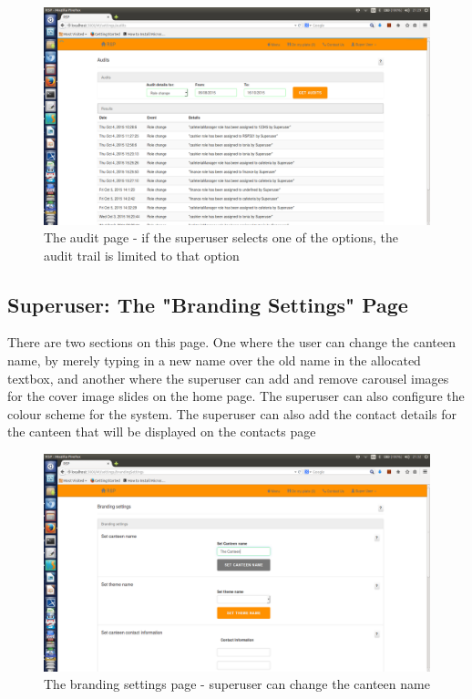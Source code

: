 \documentclass[a4paper,12pt]{report}
\begin{document}
\begin{figure}[H]
  \centering
    \includegraphics[width=1.0\textwidth]{screenshots/auditRole.png}
    \caption{The audit page - if the superuser selects one of the options, the audit trail is limited to that option} 
\end{figure}
\subsection{Superuser: The "Branding Settings" Page} 
There are two sections on this page. One where the user can change the canteen name, by merely typing in a new name over the old name in the allocated textbox, and another where the superuser can add and remove carousel images for the cover image slides on the home page. The superuser can also configure the colour scheme for the system. The superuser can also add the contact details for the canteen that will be displayed on the contacts page
\begin{figure}[H]
  \centering
    \includegraphics[width=1.0\textwidth]{screenshots/canteenName.png}
    \caption{The branding settings page - superuser can change the canteen name}
\end{figure}
\end{document}
